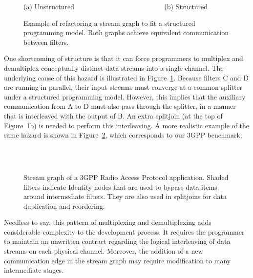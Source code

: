 \begin{figure}[t]
\vspace{-0.2\baselineskip}
\centering
{}

(a) Unstructured ~~~~~~~~~~~~~~~~~~~~~~~~~ (b) Structured~~~~~~
\caption[Refactoring a stream graph to fit a structured programming
  model.]{Example of refactoring a stream graph to fit a structured
  programming model.  Both graphs achieve equivalent communication
  between filters.
\protect\label{fig:interleaving}}
\end{figure}

  One shortcoming of structure is that it can force programmers to
  multiplex and demultiplex conceptually-distinct data streams into a
  single channel.  The underlying cause of this hazard is illustrated
  in Figure~\ref{fig:interleaving}.  Because filters C and D are
  running in parallel, their input streams must converge at a common
  splitter under a structured programming model.  However, this
  implies that the auxiliary communication from A to D must also pass
  through the splitter, in a manner that is interleaved with the
  output of B.  An extra splitjoin (at the top of
  Figure~\ref{fig:interleaving}b) is needed to perform this
  interleaving.  A more realistic example of the same hazard is shown
  in Figure~\ref{fig:3gpp}, which corresponds to our 3GPP benchmark.

\begin{figure}[t!]
\vspace{-0.9in} ~ \\
\mbox{~}\hspace{2.03in}\begin{minipage}{4in}
\caption[Use of Identity filters is illustrated by the 3GPP benchmark.]{Stream graph of a 3GPP Radio Access
  Protocol application.  Shaded filters indicate Identity nodes that
  are used to bypass data items around intermediate filters.  They are
  also used in splitjoins for data duplication and
  reordering.\protect\label{fig:3gpp}}
\vspace{-0.5in}
\end{minipage}
\end{figure}

  Needless to say, this pattern of multiplexing and demultiplexing
  adds considerable complexity to the development process.  It
  requires the programmer to maintain an unwritten contract regarding
  the logical interleaving of data streams on each physical channel.
  Moreover, the addition of a new communication edge in the stream
  graph may require modification to many intermediate stages.

